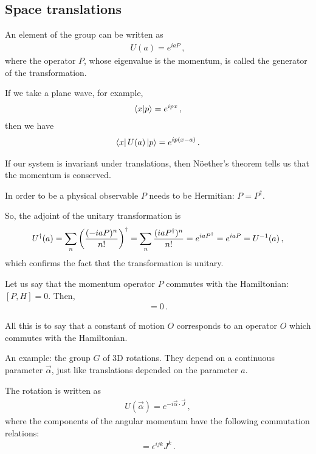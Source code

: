 \documentclass[main.tex]{subfiles}
\begin{document}
\subsection{Space translations}

An element of the group can be written as 
%
\begin{align}
U(a) = e^{i a P }
\,,
\end{align}
%
where the operator \(P\), whose eigenvalue is the momentum, is called the generator of the transformation. 

If we take a plane wave, for example,
%
\begin{align}
\braket{x}{p} = e^{i p x}
\,,
\end{align}
%
then we have 
%
\begin{align}
\bra{x} U(a) \ket{p} = e^{i p (x-a)}
\,.
\end{align}

If our system is invariant under translations, then Nöether's theorem tells us that the momentum is conserved. 

In order to be a physical observable \(P\) needs to be Hermitian: \(P = P ^\dag\). 

So, the adjoint of the unitary transformation is 
%
\begin{align}
U ^\dag (a) =
\sum _{n} \qty(\frac{(-iaP)^{n}}{n!}) ^\dag
= \sum _{n} \frac{(iaP ^\dag)^{n}}{n!}
=
e^{i a P ^\dag} = e^{iaP} = U^{-1}(a)
\,,
\end{align}
%
which confirms the fact that the transformation is unitary. 

Let us say that the momentum operator \(P\) commutes with the Hamiltonian: \([P,H] = 0\). Then, 
%
\begin{align}
[U(a), H] = 0 
\,.
\end{align}

All this is to say that a constant of motion \(O\) corresponds to an operator \(O\) which commutes with the Hamiltonian. 

An example: the group \(G\) of 3D rotations. 
They depend on a continuous parameter \(\vec{\alpha}\), just like translations depended on the parameter \(a\). 

The rotation is written as 
%
\begin{align}
U(\vec{\alpha}) = e^{-i \vec{\alpha} \cdot \vec{J}}
\,,
\end{align}
%
where the components of the angular momentum have the following commutation relations: 
%
\begin{align}
[J^{i}, J^{j}] = \epsilon^{ijk} J^{k}
\,.
\end{align}
\end{document}
